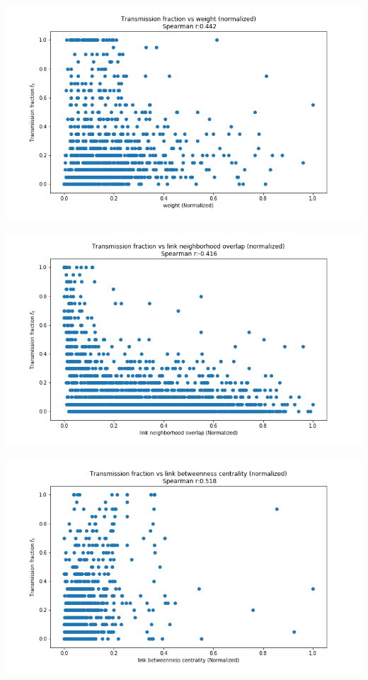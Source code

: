 \documentclass[a4paper,12pt]{article}
\begin{document}
  \begin{minipage}{0.5\textwidth}
    \includegraphics[width=\textwidth]{weight}
  \end{minipage}
  \begin{minipage}{0.5\textwidth}
    \includegraphics[width=\textwidth]{overlap}
  \end{minipage}
  \begin{minipage}{0.5\textwidth}
    \includegraphics[width=\textwidth]{linkbetweenness} 
  \end{minipage}
\end{document}
